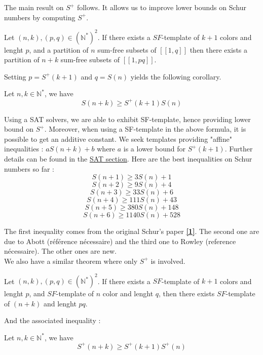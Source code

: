 The main result on \(S^+\) follows. It allows us to improve lower bounds on Schur numbers by computing \(S^+\).

\begin{theorem}
	Let \((n,k), (p,q) \in (\mathbb{N}^*)^2\). If there exists a \(SF\)-template of \(k+1\) colors and lenght \(p\),
and a partition of \(n\) sum-free subsets of \([\![1,q]\!]\) then there exists a partition of \(n+k\) sum-free subsets
of \([\![1,pq]\!]\).
\end{theorem}

Setting \(p = S^+(k+1)\) and \(q = S(n)\) yields the following corollary.

\begin{corollary}
	Let \(n, k \in \mathbb{N}^*\), we have \\
	\[ S(n+k) \geqslant S^+(k+1)S(n) \]
\end{corollary}

Using a SAT solvers, we are able to exhibit SF-template,
hence providing lower bound on \(S^+\). Moreover, when using
a SF-template in the above formula, it is possible to get an additive constant. We seek templates providing "affine"
inequalities : \(aS(n+k) + b \) where \(a\) is a lower bound for \(S^+(k+1)\). Further details can be found in the
\hyperref[SAT]{SAT section}.
Here are the best inequalities on Schur numbers so far :
\[ S(n+1) \geqslant 3S(n) + 1 \]
\[ S(n+2) \geqslant 9S(n) + 4 \]
\[ S(n+3) \geqslant 33S(n) + 6 \]
\[ S(n+4) \geqslant 111S(n) + 43 \]
\[ S(n+5) \geqslant 380S(n) + 148 \]
\[ S(n+6) \geqslant 1140S(n) + 528 \]

The first inequality comes from the original Schur's paper \hyperlink{label1}{\textbf{[1]}}. The second one are due to
Abott (référence nécessaire)
and the third one to Rowley (reference nécessaire). The other ones are new. \\

We also have a similar theorem where only \(S^+\) is involved.

\begin{theorem}
	Let \((n,k), (p,q) \in (\mathbb{N}^*)^2\). If there exists a \(SF\)-template of \(k+1\) colors and lenght \(p\),
	and \(SF\)-template of \(n\) color and lenght \(q\), then there exists \(SF\)-template of \((n+k)\) and lenght \(pq\).
\end{theorem}

And the associated inequality :

\begin{corollary}
	Let \(n, k \in \mathbb{N}^*\), we have \\
	\[ S^+(n+k) \geqslant S^+(k+1)S^+(n) \]
\end{corollary}


